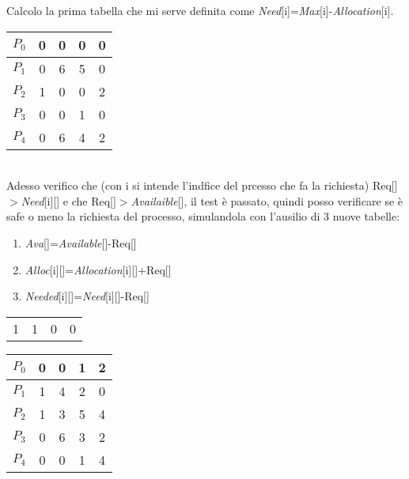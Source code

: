 \documentclass{article}
\begin{document}
    Calcolo la prima tabella che mi serve definita come \emph{Need}[i]=\emph{Max}[i]-\emph{Allocation}[i].\\
    \begin{minipage}[c]{0.3\textwidth}
        \centering
        \begin{tabular}{c|cccc}
            $P_0$ & 0 & 0 & 0 & 0\\
            \hline
            $P_1$ & 0 & 6 & 5 & 0\\
            \hline
            $P_2$ & 1 & 0 & 0 & 2\\
            \hline
            $P_3$ & 0 & 0 & 1 & 0\\
            \hline
            $P_4$ & 0 & 6 & 4 & 2\\
        \end{tabular}
    \end{minipage}\\
    Adesso verifico che (con i si intende l'indfice del prcesso che fa la richiesta) Req[]$>$\emph{Need}[i][] e che Req[]$>$\emph{Availaible}[], il test è passato, quindi posso verificare se è safe o meno la richiesta del processo, simulandola con l'ausilio di 3 nuove tabelle:
    \begin{enumerate}
        \item \emph{Ava}[]=\emph{Available}[]-Req[]
        \item \emph{Alloc}[i][]=\emph{Allocation}[i][]+Req[]
        \item \emph{Needed}[i][]=\emph{Need}[i][]-Req[]
    \end{enumerate}
    \begin{minipage}[c]{0.3\textwidth}
        \centering
        \begin{tabular}{cccc}
            1 & 1 & 0 & 0\\
        \end{tabular}
    \end{minipage}
    \begin{minipage}[c]{0.3\textwidth}
        \centering
        \begin{tabular}{c|cccc}
            $P_0$ & 0 & 0 & 1 & 2\\
            \hline
            $P_1$ & 1 & 4 & 2 & 0\\
            \hline
            $P_2$ & 1 & 3 & 5 & 4\\
            \hline
            $P_3$ & 0 & 6 & 3 & 2\\
            \hline
            $P_4$ & 0 & 0 & 1 & 4\\
        \end{tabular}
    \end{minipage}
\end{document}
